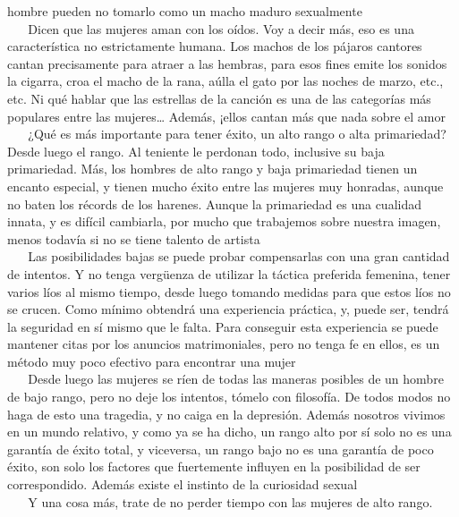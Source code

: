 hombre pueden no tomarlo como un macho maduro sexualmente\\
\hspace*{0.333em} ~ ~ Dicen que las mujeres aman con los oídos. Voy a
decir más, eso es una característica no estrictamente humana. Los machos
de los pájaros cantores cantan precisamente para atraer a las hembras,
para esos fines emite los sonidos la cigarra, croa el macho de la rana,
aúlla el gato por las noches de marzo, etc., etc. Ni qué hablar que las
estrellas de la canción es una de las categorías más populares entre las
mujeres\ldots{} Además, ¡ellos cantan más que nada sobre el amor\\
\hspace*{0.333em} ~ ~ ¿Qué es más importante para tener éxito, un alto
rango o alta primariedad? Desde luego el rango. Al teniente le perdonan
todo, inclusive su baja primariedad. Más, los hombres de alto rango y
baja primariedad tienen un encanto especial, y tienen mucho éxito entre
las mujeres muy honradas, aunque no baten los récords de los harenes.
Aunque la primariedad es una cualidad innata, y es difícil cambiarla,
por mucho que trabajemos sobre nuestra imagen, menos todavía si no se
tiene talento de artista\\
\hspace*{0.333em} ~ ~ Las posibilidades bajas se puede probar
compensarlas con una gran cantidad de intentos. Y no tenga vergüenza de
utilizar la táctica preferida femenina, tener varios líos al mismo
tiempo, desde luego tomando medidas para que estos líos no se crucen.
Como mínimo obtendrá una experiencia práctica, y, puede ser, tendrá la
seguridad en sí mismo que le falta. Para conseguir esta experiencia se
puede mantener citas por los anuncios matrimoniales, pero no tenga fe en
ellos, es un método muy poco efectivo para encontrar una mujer\\
\hspace*{0.333em} ~ ~ Desde luego las mujeres se ríen de todas las
maneras posibles de un hombre de bajo rango, pero no deje los intentos,
tómelo con filosofía. De todos modos no haga de esto una tragedia, y no
caiga en la depresión. Además nosotros vivimos en un mundo relativo, y
como ya se ha dicho, un rango alto por sí solo no es una garantía de
éxito total, y viceversa, un rango bajo no es una garantía de poco
éxito, son solo los factores que fuertemente influyen en la posibilidad
de ser correspondido. Además existe el instinto de la curiosidad
sexual\\
\hspace*{0.333em} ~ ~ Y una cosa más, trate de no perder tiempo con las
mujeres de alto rango.

